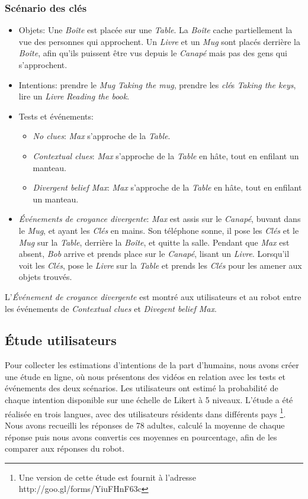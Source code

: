 \documentclass[a4paper,11pt,twoside]{StyleThese}
\begin{document}
\subsubsection{Scénario des clés}
\begin{itemize}

\item Objets: Une \textit{Boîte} est placée sur une \textit{Table}. La \textit{Boîte} cache partiellement la vue des personnes qui approchent. Un \textit{Livre} et un \textit{Mug} sont placés derrière la \textit{Boîte}, afin qu'ils puissent être vus depuis le \textit{Canapé} mais pas des gens qui s'approchent.

\item Intentions: prendre le \textit{Mug} \textit{Taking the mug}, prendre les \textit{clé}s \textit{Taking the keys}, lire un \textit{Livre} \textit{Reading the book}.

\item Tests et événements:
\begin{itemize}
\item \textit{No clues}: \textit{Max} s'approche de la \textit{Table}.
\item\textit{Contextual clues}: \textit{Max} s'approche de la \textit{Table} en hâte, tout en enfilant un manteau.
\item \textit{Divergent belief Max}: \textit{Max} s'approche de la \textit{Table} en hâte, tout en enfilant un manteau.
\end{itemize}

\item \textit{Événements de croyance divergente}: \textit{Max} est assis sur le \textit{Canapé}, buvant dans le \textit{Mug}, et ayant les \textit{Clés} en mains. Son téléphone sonne, il pose les \textit{Clés} et le \textit{Mug} sur la \textit{Table}, derrière la \textit{Boîte}, et quitte la salle. Pendant que \textit{Max} est absent, \textit{Bob} arrive et prends place sur le \textit{Canapé}, lisant un \textit{Livre}. Lorsqu'il voit les \textit{Clés}, pose le \textit{Livre} sur la \textit{Table} et prends les \textit{Clés} pour les amener aux objets trouvés.
\end{itemize}

L'\textit{Événement de croyance divergente} est montré aux utilisateurs et au robot entre les événements de \textit{Contextual clues} et \textit{Divegent belief Max}.

\subsection{Étude utilisateurs}
Pour collecter les estimations d'intentions de la part d'humains, nous avons créer une étude en ligne, où nous présentons des vidéos en relation avec les tests et événements des deux scénarios. Les utilisateurs ont estimé la probabilité de chaque intention disponible sur une échelle de Likert à 5 niveaux. L'étude a été réalisée en trois langues, avec des utilisateurs résidents dans différents pays \footnote{Une version de cette étude est fournit à l'adresse http://goo.gl/forms/YiuFHnF63c}. Nous avons recueilli les réponses de 78 adultes, calculé la moyenne de chaque réponse puis nous avons convertis ces moyennes en pourcentage, afin de les comparer aux réponses du robot.
\end{document}
